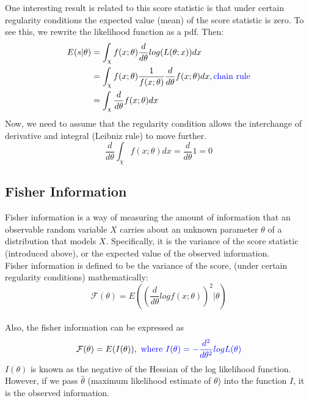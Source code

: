 \documentclass[12pt ]{article}
\begin{document}
One interesting result is related to this score statistic is that under certain regularity conditions the expected value (mean) of the score statistic is zero. To see this, we rewrite the likelihood function as a pdf. Then:
\begin{equation*}
\begin{split}
E(s|\theta) &= \int_{\chi} f(x;\theta) \frac{d}{d\theta} log(L(\theta;x)) dx\\
&=  \int_{\chi} f(x;\theta) \frac{1}{f(x;\theta)} \frac{d}{d\theta} f(x;\theta) dx, \color{blue}\text{chain rule} \color{black}\\
&=  \int_{\chi} \frac{d}{d\theta} f(x;\theta) dx
\end{split}
\end{equation*}
Now, we need to assume that the regularity condition allows the interchange of derivative and integral (Leibniz rule) to move further.
\begin{equation*}
\frac{d}{d\theta} \int_{\chi} f(x;\theta) dx = \frac{d}{d\theta} 1 = 0
\end{equation*}

\subsection{Fisher Information}
Fisher information is a way of measuring the amount of information that an observable random variable $X$ carries about an unknown parameter $\theta$ of a distribution that models $X$. Specifically, it is the variance of the score statistic (introduced above), or the expected value of the observed information.\\
Fisher information is defined to be the variance of the score, (under certain regularity conditions) mathematically:
\begin{equation}
\mathcal{F}(\theta) = E((\frac{d}{d\theta} log f(x;\theta))^2 | \theta)
\end{equation} \\

\noindent Also, the fisher information can be expressed as 
\begin{equation}
\mathcal{F}(\theta) = E(I(\theta)), \color{blue} \text{   where } I(\theta) = - \frac{d^2}{d\theta^2} log L(\theta) \color{black}
\end{equation}
$I(\theta)$ is known as the negative of the Hessian of the log likelihood function. However, if we pass $\hat{\theta}$ (maximum likelihood estimate of $\theta$) into the function $I$, it is the observed information.
\end{document}
